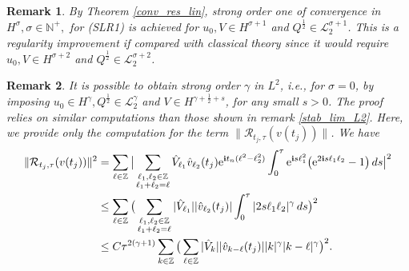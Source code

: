 \documentclass[a4paper]{amsart}
\newtheorem{remark}{Remark}[section]
\begin{document}
\begin{remark}
    By Theorem \ref{conv_res_lin}, strong order one of convergence in $H^\sigma, \sigma\in\mathbb{N}^+,$ for (SLR1) is achieved for $u_0, V \in H^{\sigma+1}$ and $Q^{\frac{1}{2}}\in\mathcal{L}_2^{\sigma+1}$. This is a regularity improvement if compared with classical theory \cite{an_co} since it would require $u_0, V \in H^{\sigma+2}$ and $Q^{\frac{1}{2}}\in \mathcal{L}_2^{\sigma+2}$.
\end{remark}
\begin{remark} It is possible to obtain strong order $\gamma$ in $L^2$, i.e., for $\sigma=0$, by imposing $u_0\in H^\gamma, Q^{\frac{1}{2}}\in \mathcal{L}_2^\gamma$ and $V\in H^{\gamma+\frac{1}{2}+s}$, for any small $s>0$. The proof relies on similar computations than those shown in remark \ref{stab_lim_L2}. Here, we provide only the computation for the term $\|\mathcal{R}_{t_j,\tau}(v(t_j))\|$.
We have
\begin{align*}
    \|\mathcal{R}_{t_j,\tau}(v(t_j))\|^2&=\displaystyle\sum_{\ell\in\mathbb{Z}}\big|\displaystyle\sum_{\substack{\ell_1,\ell_2\in\mathbb{Z}\\ \ell_1+\ell_2=\ell}}\hat{V}_{\ell_1}\hat{v}_{\ell_2}(t_j){\rm e}^{{\bf i}t_n(\ell^2-\ell_2^2)}\int_{0}^{\tau}{\rm e}^{{\bf i}s \ell_1^2}\big({\rm e}^{2{\bf i}s \ell_1 \ell_2}-1\big)\,ds\big|^2\\
    &\le \displaystyle\sum_{\ell\in\mathbb{Z}}\big(\displaystyle\sum_{\substack{\ell_1,\ell_2\in\mathbb{Z}\\ \ell_1+\ell_2=\ell}}|\hat{V}_{\ell_1}| |\hat{v}_{\ell_2}(t_j)|\int_{0}^{\tau}|2s\ell_1 \ell_2|^\gamma\,ds\big)^2\\
    &\le C \tau^{2(\gamma+1)} \displaystyle\sum_{k\in\mathbb{Z}}\big(\sum_{\ell\in\mathbb{Z}}|\hat{V}_{k}| |\hat{v}_{k-\ell}(t_j)||k|^\gamma |k-\ell|^\gamma\big)^2.

\end{align*}
\end{remark}
\end{document}
